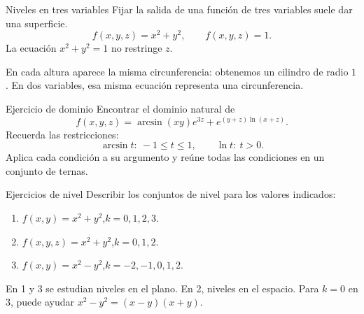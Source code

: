 \begin{frame}{Niveles en tres variables}
Fijar la salida de una función de tres variables suele dar una superficie.
\[f(x,y,z)=x^2+y^2,\qquad f(x,y,z)=1.\]
La ecuación $x^2+y^2=1$ no restringe $z$.

En cada altura aparece la misma circunferencia: obtenemos un cilindro de radio $1$.
\medskip
En dos variables, esa misma ecuación representa una circunferencia.
\end{frame}
\begin{frame}{Ejercicio de dominio}
Encontrar el dominio natural de
\[f(x,y,z)=\arcsin(xy)e^{3z}+e^{(y+z)\ln(x+z)}.\]
Recuerda las restricciones:
\[\arcsin t:\ -1\le t\le1,\qquad \ln t:\ t>0.\]
Aplica cada condición a su argumento y reúne todas las condiciones en un conjunto de ternas.
\end{frame}
\begin{frame}{Ejercicios de nivel}
Describir los conjuntos de nivel para los valores indicados:
\begin{enumerate}
\item $f(x,y)=x^2+y^2$,\quad $k=0,1,2,3$.
\item $f(x,y,z)=x^2+y^2$,\quad $k=0,1,2$.
\item $f(x,y)=x^2-y^2$,\quad $k=-2,-1,0,1,2$.
\end{enumerate}
En 1 y 3 se estudian niveles en el plano. En 2, niveles en el espacio.
\medskip
Para $k=0$ en 3, puede ayudar $x^2-y^2=(x-y)(x+y)$.
\end{frame}

